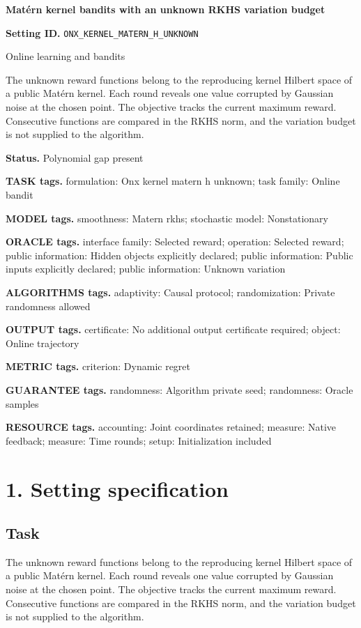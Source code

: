\documentclass[10pt,a4paper]{article}
\begin{document}
\raggedright

{\LARGE\bfseries\sffamily\color{AtlasNavy} Matérn kernel bandits with an unknown RKHS variation budget\par}\vspace{5pt}
\textbf{Setting ID.} \texttt{ONX\_\allowbreak{}\allowbreak{}KERNEL\_\allowbreak{}\allowbreak{}MATERN\_\allowbreak{}\allowbreak{}H\_\allowbreak{}\allowbreak{}UNKNOWN}

Online learning and bandits

The unknown reward functions belong to the reproducing kernel Hilbert space of a public Matérn kernel. Each round reveals one value corrupted by Gaussian noise at the chosen point. The objective tracks the current maximum reward. Consecutive functions are compared in the RKHS norm, and the variation budget is not supplied to the algorithm.

\textbf{Status.} Polynomial gap present

\textbf{TASK tags.} formulation: Onx kernel matern h unknown; task family: Online bandit

\textbf{MODEL tags.} smoothness: Matern rkhs; stochastic model: Nonstationary

\textbf{ORACLE tags.} interface family: Selected reward; operation: Selected reward; public information: Hidden objects explicitly declared; public information: Public inputs explicitly declared; public information: Unknown variation

\textbf{ALGORITHMS tags.} adaptivity: Causal protocol; randomization: Private randomness allowed

\textbf{OUTPUT tags.} certificate: No additional output certificate required; object: Online trajectory

\textbf{METRIC tags.} criterion: Dynamic regret

\textbf{GUARANTEE tags.} randomness: Algorithm private seed; randomness: Oracle samples

\textbf{RESOURCE tags.} accounting: Joint coordinates retained; measure: Native feedback; measure: Time rounds; setup: Initialization included

\section{1. Setting specification}
\subsection{Task}
The unknown reward functions belong to the reproducing kernel Hilbert space of a public Matérn kernel. Each round reveals one value corrupted by Gaussian noise at the chosen point. The objective tracks the current maximum reward. Consecutive functions are compared in the RKHS norm, and the variation budget is not supplied to the algorithm.
\end{document}
